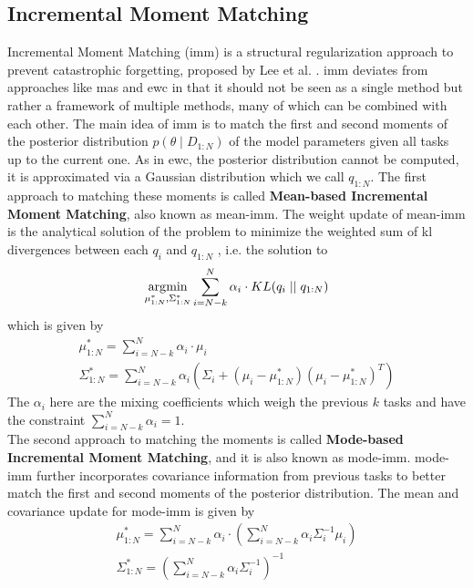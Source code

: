 \subsection{Incremental Moment Matching}
\label{sec:Related_work:Continual_Learning:IMM}
Incremental Moment Matching (\gls{imm}) is a structural regularization approach to prevent catastrophic forgetting, proposed by Lee et al. \cite{lee2017overcoming}.
\gls{imm} deviates from approaches like \gls{mas} and \gls{ewc} in that it should not be seen as a single method but rather a framework of multiple methods, many of which can be
combined with each other. The main idea of \gls{imm} is to match the first and second moments of the posterior distribution $p(\theta \mid D_{1:N})$ of the model 
parameters given all tasks up to the current one. As in \gls{ewc}, the posterior distribution cannot be computed, it is approximated via a Gaussian distribution which
we call $q_{1:N}$. The first approach to matching these moments is called \textbf{Mean-based Incremental Moment Matching}, also known as mean-\gls{imm}. The weight
update of mean-\gls{imm} is the analytical solution of the problem to minimize the weighted sum of \gls{kl} divergences between each $q_i$ and $q_{1:N}$
\cite{goldberger2004hierarchical}, i.e. the solution to
\begin{equation}
    \operatorname*{\arg\!\min}_{\mu^*_{1:N},\Sigma^*_{1:N}} \sum_{i=N-k}^N \alpha_i \cdot KL(q_i \mid \mid q_{1:N})
\end{equation}
which is given by
\begin{gather}
    \mu^*_{1:N} = \sum_{i=N-k}^N \alpha_i \cdot \mu_i \\
    \Sigma^*_{1:N} = \sum_{i=N-k}^N \alpha_i (\Sigma_i + (\mu_i - \mu^*_{1:N})(\mu_i - \mu^*_{1:N})^T)
\end{gather}
The $\alpha_i$ here are the mixing coefficients which weigh the previous $k$ tasks and have the constraint $\sum_{i=N-k}^N \alpha_i = 1$.  \\
The second approach to matching the moments is called \textbf{Mode-based Incremental Moment Matching}, and it is also known as mode-\gls{imm}. mode-\gls{imm}
further incorporates covariance information from previous tasks to better match the first and second moments of the posterior distribution. 
The mean and covariance update for mode-\gls{imm} is given by
\begin{gather}
    \mu^*_{1:N} = \sum_{i=N-k}^N \alpha_i \cdot (\sum_{i=N-k}^N \alpha_i \Sigma_i^{-1} \mu_i) \\
    \Sigma^*_{1:N} = (\sum_{i=N-k}^N \alpha_i  \Sigma_i^{-1})^{-1}
\end{gather}
